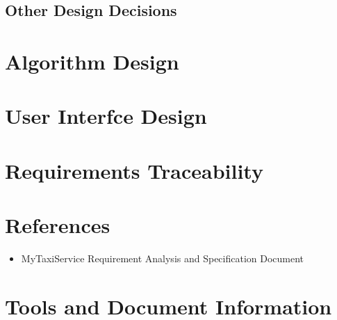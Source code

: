 \documentclass[11pt, a4paper,titlepage]{article}
\newcommand{\productname}{MyTaxiService }
\begin{document}
\subsection{Other Design Decisions}

\section{Algorithm Design}
\section{User Interfce Design}
\section{Requirements Traceability}
\section{References}
\begin{itemize}
	\item \productname Requirement Analysis and Specification Document
\end{itemize}
\section{Tools and Document Information}
\end{document}
